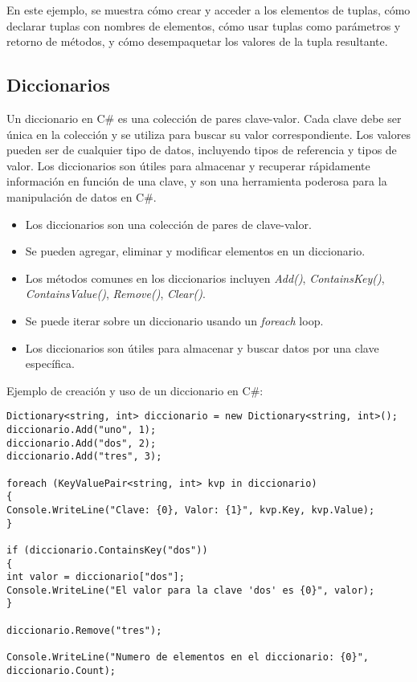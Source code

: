 \documentclass[executivepaper]{article}
\begin{document}
En este ejemplo, se muestra cómo crear y acceder a los elementos de tuplas, cómo declarar tuplas con nombres de elementos, cómo usar tuplas como parámetros y retorno de métodos, y cómo desempaquetar los valores de la tupla resultante.

\subsection{Diccionarios}

Un diccionario en C\# es una colección de pares clave-valor. Cada clave debe ser única en la colección y se utiliza para buscar su valor correspondiente. Los valores pueden ser de cualquier tipo de datos, incluyendo tipos de referencia y tipos de valor. Los diccionarios son útiles para almacenar y recuperar rápidamente información en función de una clave, y son una herramienta poderosa para la manipulación de datos en C\#.
\begin{itemize}
    \item Los diccionarios son una colección de pares de clave-valor.
    \item Se pueden agregar, eliminar y modificar elementos en un diccionario.
    \item Los métodos comunes en los diccionarios incluyen \emph{Add()}, \emph{ContainsKey()}, \emph{ContainsValue()}, \emph{Remove()}, \emph{Clear()}.
    \item Se puede iterar sobre un diccionario usando un \emph{foreach} loop.
    \item Los diccionarios son útiles para almacenar y buscar datos por una clave específica.
\end{itemize}

Ejemplo de creación y uso de un diccionario en C\#:
\begin{lstlisting}
Dictionary<string, int> diccionario = new Dictionary<string, int>();
diccionario.Add("uno", 1);
diccionario.Add("dos", 2);
diccionario.Add("tres", 3);

foreach (KeyValuePair<string, int> kvp in diccionario)
{
Console.WriteLine("Clave: {0}, Valor: {1}", kvp.Key, kvp.Value);
}

if (diccionario.ContainsKey("dos"))
{
int valor = diccionario["dos"];
Console.WriteLine("El valor para la clave 'dos' es {0}", valor);
}

diccionario.Remove("tres");

Console.WriteLine("Numero de elementos en el diccionario: {0}", diccionario.Count);
\end{lstlisting}
\end{document}
